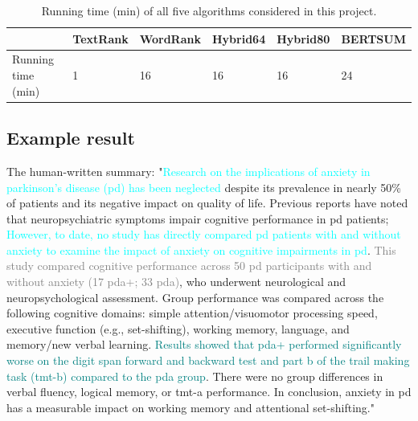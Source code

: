 \documentclass[11pt]{article}
\begin{document}
\begin{table}[!h]
\centering
\begin{tabular}{l|lllll}
\hline
&\textbf{TextRank} & \textbf{WordRank} & \textbf{Hybrid64} & \textbf{Hybrid80} & \textbf{BERTSUM}\\
\hline
Running time (min) & 1 & 16 & 16 & 16 & 24\\
\hline
\end{tabular}
\caption{\label{tab:time}
Running time (min) of all five algorithms considered in this project.
}
\end{table}

\subsection{Example result}

The human-written summary: "\textcolor{cyan}{Research on the implications of anxiety in parkinson's disease (pd) has been neglected} despite its prevalence in nearly 50\% of patients and its negative impact on quality of life. Previous reports have noted that neuropsychiatric symptoms impair cognitive performance in pd patients; \textcolor{cyan}{However, to date, no study has directly compared pd patients with and without anxiety to examine the impact of anxiety on cognitive impairments in pd}. \textcolor{gray}{This study compared cognitive performance across 50 pd participants with and without anxiety (17 pda+; 33 pda)}, who underwent neurological and neuropsychological assessment. Group performance was compared across the following cognitive domains: simple attention/visuomotor processing speed, executive function (e.g., set-shifting), working memory, language, and memory/new verbal learning. \textcolor{teal}{Results showed that pda+ performed significantly worse on the digit span forward and backward test and part b of the trail making task (tmt-b) compared to the pda group}. There were no group differences in verbal fluency, logical memory, or tmt-a performance. In conclusion, anxiety in pd has a measurable impact on working memory and attentional set-shifting."
\end{document}
